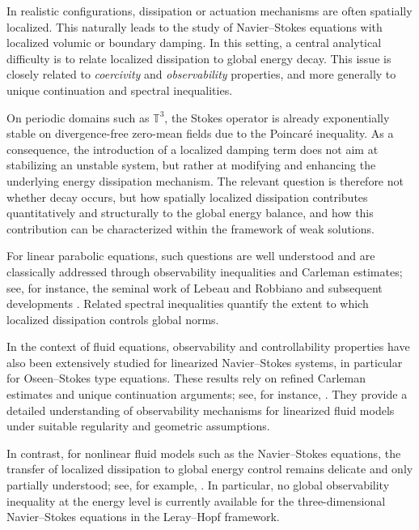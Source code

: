 \documentclass[preprint,12pt]{elsarticle}
\begin{document}
In realistic configurations, dissipation or actuation mechanisms are often
spatially localized.
This naturally leads to the study of Navier--Stokes equations with localized
volumic or boundary damping.
In this setting, a central analytical difficulty is to relate localized
dissipation to global energy decay.
This issue is closely related to \emph{coercivity} and \emph{observability}
properties, and more generally to unique continuation and spectral inequalities.

On periodic domains such as $\mathbb{T}^3$, the Stokes operator is already
exponentially stable on divergence-free zero-mean fields due to the Poincar\'e
inequality.
As a consequence, the introduction of a localized damping term does not aim at
stabilizing an unstable system, but rather at modifying and enhancing the
underlying energy dissipation mechanism.
The relevant question is therefore not whether decay occurs, but how spatially
localized dissipation contributes quantitatively and structurally to the global
energy balance, and how this contribution can be characterized within the
framework of weak solutions.

For linear parabolic equations, such questions are well understood and are
classically addressed through observability inequalities and Carleman estimates;
see, for instance, the seminal work of Lebeau and Robbiano
\cite{LebeauRobbiano1995} and subsequent developments
\cite{apraiz2014observability}.
Related spectral inequalities quantify the extent to which localized dissipation
controls global norms.

In the context of fluid equations, observability and controllability properties
have also been extensively studied for linearized Navier--Stokes systems,
in particular for Oseen--Stokes type equations.
These results rely on refined Carleman estimates and unique continuation
arguments; see, for instance,
\cite{fursikov1996imanuvilov,fursikov1996local,coron1996global,coron2009null}.
They provide a detailed understanding of observability mechanisms for linearized
fluid models under suitable regularity and geometric assumptions.

In contrast, for nonlinear fluid models such as the Navier--Stokes equations,
the transfer of localized dissipation to global energy control remains delicate
and only partially understood; see, for example, \cite{Shirikyan2007}.
In particular, no global observability inequality at the energy level is
currently available for the three-dimensional Navier--Stokes equations in the
Leray--Hopf framework.
\end{document}
